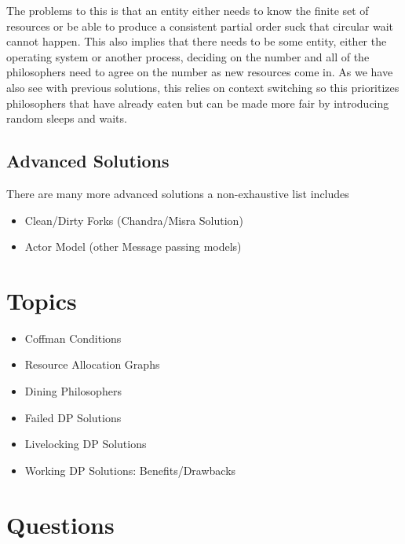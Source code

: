 The problems to this is that an entity either needs to know the finite set of resources or be able to produce a consistent partial order suck that circular wait cannot happen. This also implies that there needs to be some entity, either the operating system or another process, deciding on the number and all of the philosophers need to agree on the number as new resources come in. As we have also see with previous solutions, this relies on context switching so this prioritizes philosophers that have already eaten but can be made more fair by introducing random sleeps and waits.



\subsection{Advanced Solutions}

There are many more advanced solutions a non-exhaustive list includes 
\begin{itemize}
\item Clean/Dirty Forks (Chandra/Misra Solution) 
\item Actor Model (other Message passing models)
\end{itemize}

\section{Topics}

\begin{itemize}
  \item Coffman Conditions
  \item Resource Allocation Graphs
  \item Dining Philosophers
  \item Failed DP Solutions 
  \item Livelocking DP Solutions 
  \item Working DP Solutions: Benefits/Drawbacks
\end{itemize}

\section{Questions}

